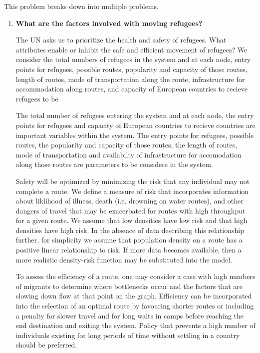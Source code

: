 \documentclass{article}
\begin{document}
This problem breaks down into multiple problems.

\begin{enumerate}
    \item {\bf What are the factors involved with moving refugees?}

    The UN asks us to prioritize the health and safety of refugees. What attributes enable or inhibit the safe and efficient movement of refugees? We consider the total numbers of refugees in the system and at each node, entry points for refugees, possible routes, popularity and capacity of those routes, length of routes, mode of transportation along the route, infrastructure for accommodation along routes, and capacity of European countries to recieve refugees to be 

    The total number of refugees entering the system and at each node, the entry points for refugees and capacity of European countries to recieve countries are important variables within the system. The entry points for refugees, possible routes, the popularity and capacity of those routes, the length of routes, mode of transportation and availabilty of infrastructure for accomodation along those routes are parameters to be considere in the system.

    Safety will be optimized by minimizing the risk that any individual may not complete a route. We define a measure of risk that incorporates information about liklihood of illness, death (i.e. drowning on water routes), and other dangers of travel that may be exacerbated for routes with high throughput for a given route. We assume that low densities have low risk and that high densities have high risk. In the absence of data describing this relationship further, for simplicity we assume that population density on a route has a positive linear relationship to risk. If more data becomes available, then a more realistic density-risk function may be substituted into the model.

    To assess the efficiency of a route, one may consider a case with high numbers of migrants to determine where bottlenecks occur and the factors that are slowing down flow at that point on the graph. Efficiency can be incorporated into the selection of an optimal route by favouring shorter routes or including a penalty for slower travel and for long waits in camps before reaching the end destination and exiting the system. Policy that prevents a high number of individuals existing for long periods of time without settling in a country should be preferred.


\end{enumerate}
\end{document}
